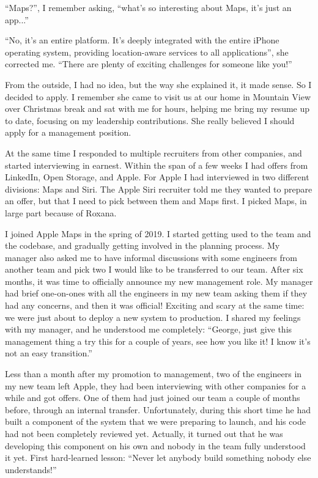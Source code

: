 \documentclass[12pt]{book}
\begin{document}
``Maps?'', I remember asking, ``what's so interesting about Maps, it's
just an app...''

``No, it's an entire platform. It's deeply integrated with the entire
iPhone operating system, providing location-aware services to all
applications'', she corrected me. ``There are plenty of exciting
challenges for someone like you!''

From the outside, I had no idea, but the way she explained it, it made
sense. So I decided to apply. I remember she came to visit us at our
home in Mountain View over Christmas break and sat with me for hours,
helping me bring my resume up to date, focusing on my leadership
contributions. She really believed I should apply for a management
position.

At the same time I responded to multiple recruiters from other
companies, and started interviewing in earnest. Within the span of a few
weeks I had offers from LinkedIn, Open Storage, and Apple. For Apple I
had interviewed in two different divisions: Maps and Siri. The Apple
Siri recruiter told me they wanted to prepare an offer, but that I need
to pick between them and Maps first. I picked Maps, in large part
because of Roxana.

I joined Apple Maps in the spring of 2019. I started getting used to the
team and the codebase, and gradually getting involved in the planning
process. My manager also asked me to have informal discussions with some
engineers from another team and pick two I would like to be transferred
to our team. After six months, it was time to officially announce my new
management role. My manager had brief one-on-ones with all the engineers
in my new team asking them if they had any concerns, and then it was
official! Exciting and scary at the same time: we were just about to
deploy a new system to production. I shared my feelings with my manager,
and he understood me completely: ``George, just give this management
thing a try this for a couple of years, see how you like it! I know it's
not an easy transition.''

Less than a month after my promotion to management, two of the engineers
in my new team left Apple, they had been interviewing with other
companies for a while and got offers. One of them had just joined our
team a couple of months before, through an internal transfer.
Unfortunately, during this short time he had built a component of the
system that we were preparing to launch, and his code had not been
completely reviewed yet. Actually, it turned out that he was developing
this component on his own and nobody in the team fully understood it
yet. First hard-learned lesson: ``Never let anybody build something
nobody else understands!''
\end{document}
